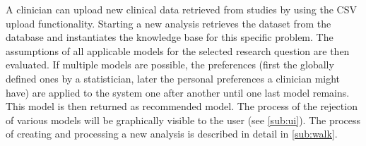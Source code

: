 A clinician can upload new clinical data retrieved from studies by using the CSV upload functionality. Starting a new analysis retrieves the dataset from the database and instantiates the knowledge base for this specific problem. The assumptions of all applicable models for the selected research question are then evaluated. If multiple models are possible, the preferences (first the globally defined ones by a statistician, later the personal preferences a clinician might have) are applied to the system one after another until one last model remains. This model is then returned as recommended model. The process of the rejection of various models will be graphically visible to the user (see \autoref{sub:ui}). The process of creating and processing a new analysis is described in detail in \autoref{sub:walk}.


